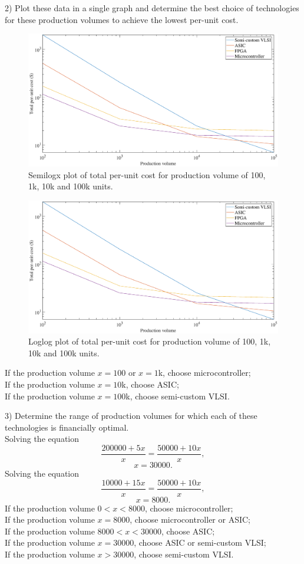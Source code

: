 \documentclass[a4paper]{article}
\begin{document}
2) Plot these data in a single graph and determine the best choice of technologies for these production volumes to achieve the lowest per-unit cost.
\begin{figure}[H]
    \centering
    \includegraphics[width=1\textwidth]{7-2-1.eps}
    \caption{Semilogx plot of total per-unit cost for production volume of 100, 1k, 10k and 100k units.}
\end{figure}
\begin{figure}[H]
    \centering
    \includegraphics[width=1\textwidth]{7-2-2.eps}
    \caption{Loglog plot of total per-unit cost for production volume of 100, 1k, 10k and 100k units.}
\end{figure}
\noindent If the production volume $x=100$ or $x=1$k, choose microcontroller;\\
If the production volume $x=10$k, choose ASIC;\\
If the production volume $x=100$k, choose semi-custom VLSI.

3) Determine the range of production volumes for which each of these technologies is financially optimal.\\
Solving the equation
\[\frac{200000+5x}{x}=\frac{50000+10x}{x},\]
\[x=30000.\]
Solving the equation
\[\frac{10000+15x}{x}=\frac{50000+10x}{x},\]
\[x=8000.\]
If the production volume $0<x<8000$, choose microcontroller;\\
If the production volume $x=8000$, choose microcontroller or ASIC;\\
If the production volume $8000<x<30000$, choose ASIC;\\
If the production volume $x=30000$, choose ASIC or semi-custom VLSI;\\
If the production volume $x>30000$, choose semi-custom VLSI.
\inputminted[frame=single,bgcolor=bg,breaklines,linenos]{matlab}{hw1q7_2.m}
\end{document}
